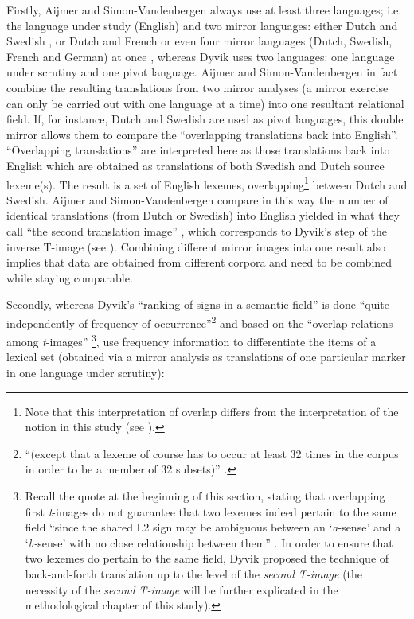 Firstly, Aijmer and Simon-Vandenbergen always use at least three languages; i.e. the language under study (English) and two mirror languages: either Dutch and Swedish \citep{aijmer_model_2004}, or Dutch and French \citep{simon-vandenbergen_english_2013} or even four mirror languages (Dutch, Swedish, French and German) at once \citep{simon-vandenbergen_semantic_2007}, whereas Dyvik uses two languages: one language under scrutiny and one pivot language. Aijmer and Simon-Vandenbergen in fact combine the resulting translations from two mirror analyses (a mirror exercise can only be carried out with one language at a time) into one resultant relational field. If, for instance, Dutch and Swedish are used as pivot languages, this double mirror allows them to compare the “overlapping translations back into English”. “Overlapping translations” are interpreted here as those translations back into English which are obtained as translations of both Swedish and Dutch source lexeme(s). The result is a set of English lexemes, overlapping\footnote{Note that this interpretation of overlap differs from the interpretation of the notion in this study (see ).} between Dutch and Swedish. Aijmer and Simon-Vandenbergen compare in this way the number of identical translations (from Dutch or Swedish) into English yielded in what they call “the second translation image” \citep[1796]{aijmer_model_2004}, which corresponds to Dyvik’s step of the inverse T-image (see ). Combining different mirror images into one result also implies that data are obtained from different corpora and need to be combined while staying comparable.

Secondly, whereas Dyvik’s “ranking of signs in a semantic field” is done “quite independently of frequency of occurrence”\footnote{“(except that a lexeme of course has to occur at least 32 times in the corpus in order to be a member of 32 subsets)” \citep[73]{johansson_translational_1998}.} and based on the “overlap relations among \textit{t}{}-images” \citep[73]{johansson_translational_1998}\footnote{Recall the quote at the beginning of this section, stating that overlapping first \textit{t}{}-images do not guarantee that two lexemes indeed pertain to the same field “since the shared L2 sign may be ambiguous between an ‘\textit{a}{}-sense’ and a ‘\textit{b-}sense’ with no close relationship between them” \citep[72]{johansson_translational_1998}. In order to ensure that two lexemes do pertain to the same field, Dyvik proposed the technique of back-and-forth translation up to the level of the \textit{second} \textit{T-image} (the necessity of the \textit{second} \textit{T-image} will be further explicated in the methodological chapter of this study).}, \citet{aijmer_model_2004} use frequency information to differentiate the items of a lexical set (obtained via a mirror analysis as translations of one particular marker in one language under scrutiny): 

